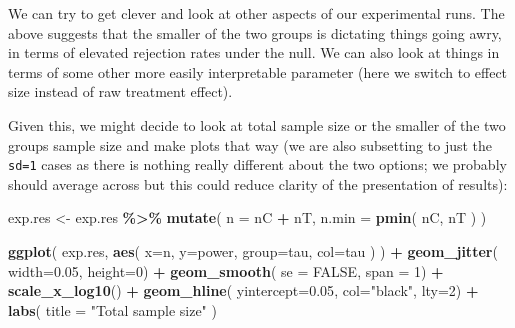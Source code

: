 \documentclass[
]{book}
\newenvironment{Shaded}{\begin{snugshade}}{\end{snugshade}}
\newcommand{\AttributeTok}[1]{\textcolor[rgb]{0.13,0.29,0.53}{#1}}
\newcommand{\ConstantTok}[1]{\textcolor[rgb]{0.56,0.35,0.01}{#1}}
\newcommand{\DecValTok}[1]{\textcolor[rgb]{0.00,0.00,0.81}{#1}}
\newcommand{\FloatTok}[1]{\textcolor[rgb]{0.00,0.00,0.81}{#1}}
\newcommand{\FunctionTok}[1]{\textcolor[rgb]{0.13,0.29,0.53}{\textbf{#1}}}
\newcommand{\NormalTok}[1]{#1}
\newcommand{\OtherTok}[1]{\textcolor[rgb]{0.56,0.35,0.01}{#1}}
\newcommand{\SpecialCharTok}[1]{\textcolor[rgb]{0.81,0.36,0.00}{\textbf{#1}}}
\newcommand{\StringTok}[1]{\textcolor[rgb]{0.31,0.60,0.02}{#1}}
\begin{document}
We can try to get clever and look at other aspects of our experimental runs.
The above suggests that the smaller of the two groups is dictating things
going awry, in terms of elevated rejection rates under the null. We can also
look at things in terms of some other more easily interpretable parameter
(here we switch to effect size instead of raw treatment effect).

Given this, we might decide to look at total sample size or the smaller of
the two groups sample size and make plots that way (we are also subsetting to
just the \texttt{sd=1} cases as there is nothing really different about the two
options; we probably should average across but this could reduce clarity of
the presentation of results):

\begin{Shaded}
\begin{Highlighting}[]
\NormalTok{exp.res }\OtherTok{\textless{}{-}}\NormalTok{ exp.res }\SpecialCharTok{\%\textgreater{}\%} \FunctionTok{mutate}\NormalTok{( }\AttributeTok{n =}\NormalTok{ nC }\SpecialCharTok{+}\NormalTok{ nT,}
                               \AttributeTok{n.min =} \FunctionTok{pmin}\NormalTok{( nC, nT ) )}
\end{Highlighting}
\end{Shaded}

\begin{Shaded}
\begin{Highlighting}[]
\FunctionTok{ggplot}\NormalTok{( exp.res, }\FunctionTok{aes}\NormalTok{( }\AttributeTok{x=}\NormalTok{n, }\AttributeTok{y=}\NormalTok{power, }\AttributeTok{group=}\NormalTok{tau, }\AttributeTok{col=}\NormalTok{tau ) ) }\SpecialCharTok{+}
  \FunctionTok{geom\_jitter}\NormalTok{( }\AttributeTok{width=}\FloatTok{0.05}\NormalTok{, }\AttributeTok{height=}\DecValTok{0}\NormalTok{) }\SpecialCharTok{+}
  \FunctionTok{geom\_smooth}\NormalTok{( }\AttributeTok{se =} \ConstantTok{FALSE}\NormalTok{, }\AttributeTok{span =} \DecValTok{1}\NormalTok{) }\SpecialCharTok{+}
  \FunctionTok{scale\_x\_log10}\NormalTok{() }\SpecialCharTok{+}
  \FunctionTok{geom\_hline}\NormalTok{( }\AttributeTok{yintercept=}\FloatTok{0.05}\NormalTok{, }\AttributeTok{col=}\StringTok{"black"}\NormalTok{, }\AttributeTok{lty=}\DecValTok{2}\NormalTok{) }\SpecialCharTok{+}
  \FunctionTok{labs}\NormalTok{( }\AttributeTok{title =} \StringTok{"Total sample size"}\NormalTok{ )}
\end{Highlighting}
\end{Shaded}
\end{document}
